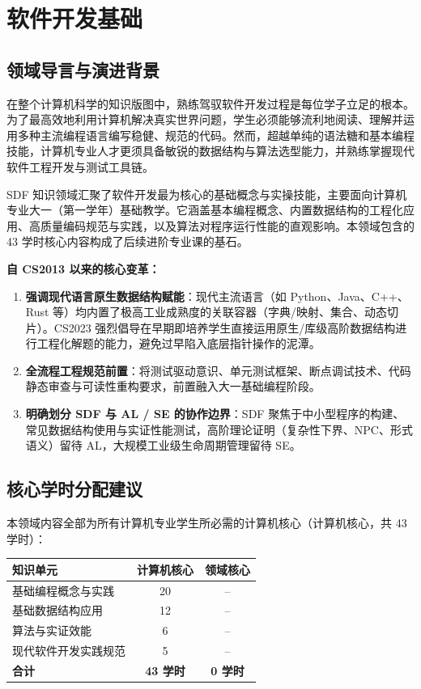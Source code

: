\chapter{软件开发基础}

\section{领域导言与演进背景}

\begin{preamblebox}[知识领域概述与变革]
在整个计算机科学的知识版图中，熟练驾驭软件开发过程是每位学子立足的根本。为了最高效地利用计算机解决真实世界问题，学生必须能够流利地阅读、理解并运用多种主流编程语言编写稳健、规范的代码。然而，超越单纯的语法糖和基本编程技能，计算机专业人才更须具备敏锐的数据结构与算法选型能力，并熟练掌握现代软件工程开发与测试工具链。

SDF 知识领域汇聚了软件开发最为核心的基础概念与实操技能，主要面向计算机专业大一（第一学年）基础教学。它涵盖基本编程概念、内置数据结构的工程化应用、高质量编码规范与实践，以及算法对程序运行性能的直观影响。本领域包含的 43 学时核心内容构成了后续进阶专业课的基石。

\textbf{自 CS2013 以来的核心变革：}
\begin{enumerate}
    \item \textbf{强调现代语言原生数据结构赋能}：现代主流语言（如 Python、Java、C++、Rust 等）均内置了极高工业成熟度的关联容器（字典/映射、集合、动态切片）。CS2023 强烈倡导在早期即培养学生直接运用原生/库级高阶数据结构进行工程化解题的能力，避免过早陷入底层指针操作的泥潭。
    \item \textbf{全流程工程规范前置}：将测试驱动意识、单元测试框架、断点调试技术、代码静态审查与可读性重构要求，前置融入大一基础编程阶段。
    \item \textbf{明确划分 SDF 与 AL / SE 的协作边界}：SDF 聚焦于中小型程序的构建、常见数据结构使用与实证性能测试，高阶理论证明（复杂性下界、NPC、形式语义）留待 AL，大规模工业级生命周期管理留待 SE。
\end{enumerate}
\end{preamblebox}

\section{核心学时分配建议}

本领域内容全部为所有计算机专业学生所必需的计算机核心（计算机核心，共 43 学时）：

\begin{table}[H]
\centering
\setlength{\tabcolsep}{3.5pt}\fontsize{8pt}{9.6pt}\selectfont\begin{tabularx}{\columnwidth}{Y c c}
\toprule
\textbf{知识单元} & \textbf{计算机核心} & \textbf{领域核心} \\
\midrule
基础编程概念与实践 & 20 & -- \\
基础数据结构应用 & 12 & -- \\
算法与实证效能 & 6 & -- \\
现代软件开发实践规范 & 5 & -- \\
\midrule
\textbf{合计} & \textbf{43 学时} & \textbf{0 学时} \\
\bottomrule
\end{tabularx}
\end{table}

